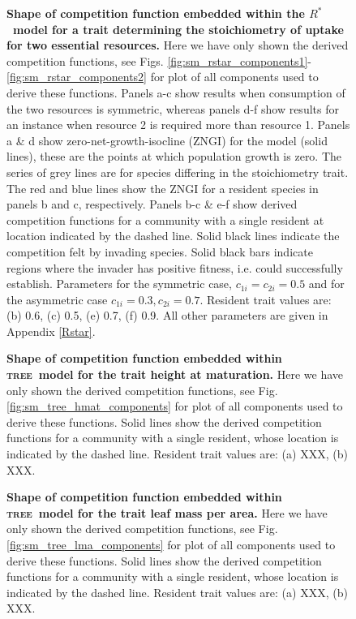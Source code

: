 \documentclass[a4paper,11pt]{article}
\newcommand{\Rstar}{\ensuremath{R^*}}
\newcommand{\TREE}{\textsc{tree}}
\begin{document}
\begin{figure}[h]
  \centering
  \caption{\textbf{Shape of competition function embedded within the \Rstar\ model
  for a trait determining the stoichiometry of uptake for two essential resources.}
  Here we have only shown the derived  competition functions, see Figs.
  \ref{fig:sm_rstar_components1}-\ref{fig:sm_rstar_components2} for plot of all
  components used to derive these functions.
  Panels a-c show results when consumption of the two resources is symmetric, whereas
  panels d-f show results for an instance when resource 2 is required more than
  resource 1. Panels a \& d show zero-net-growth-isocline (ZNGI) for
  the  model  (solid lines), these are the points at which population growth is zero.
  The series of grey lines are for species differing in the stoichiometry trait.
  The red and blue lines show the ZNGI for a resident species in panels b and
  c, respectively. Panels b-c \& e-f show derived competition functions for a
  community with a single resident at location indicated by the dashed line.
  Solid black lines indicate the competition felt by invading species. Solid
  black bars indicate regions where the invader has positive fitness, i.e.
  could successfully establish. Parameters for the symmetric case, $c_{1i} =
  c_ {2i}=0.5$ and for the asymmetric case $c_{1i} = 0.3, c_ {2i}=0.7$. Resident
  trait values are: (b) 0.6, (c) 0.5, (e) 0.7, (f) 0.9. All other parameters
  are given in Appendix \ref{Rstar}.
  \label{fig:Rstar}}
\end{figure}

\begin{figure}[h]
  \centering
  \caption{\textbf{Shape of competition function embedded within \TREE\ model for
  the trait height at maturation.}
  Here we have only shown the derived  competition functions, see Fig.
  \ref{fig:sm_tree_hmat_components} for plot of all components used to derive these functions.
  Solid lines show the derived competition functions for a community with a
  single resident, whose location is indicated by the dashed line.
  Resident trait values are: (a) XXX, (b) XXX.
  \label{fig:tree_hmat}}
\end{figure}

\begin{figure}[h]
  \centering
  \caption{\textbf{Shape of competition function embedded within \TREE\ model for
  the trait leaf mass per area.}
  Here we have only shown the derived  competition functions, see Fig.
  \ref{fig:sm_tree_lma_components} for plot of all components used to derive these functions.
  Solid lines show the derived competition functions for a community with a
  single resident, whose location is indicated by the dashed line.
  Resident trait values are: (a) XXX, (b) XXX.
  \label{fig:tree_lma}}
\end{figure}
\end{document}

